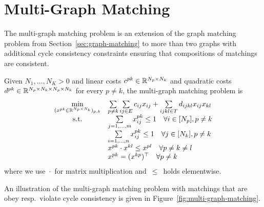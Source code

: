 \section{Multi-Graph Matching}
\label{sec:multi-graph-matching}
The multi-graph matching problem is an extension of the graph matching problem from Section~\ref{sec:graph-matching} to more than two graphs with additional cycle consistency constraints ensuring that compositions of matchings are consistent.

\begin{definition}
Given $N_1,\ldots,N_K > 0$ and linear costs $c^{pk} \in \mathbb{R}^{N_p \times N_k}$ and quadratic costs $d^{pk} \in \mathbb{R}^{N_p \times N_k \times N_p \times N_k}$ for every $p \neq k$, the multi-graph matching problem is
\begin{equation}
\begin{array}{cl}
    \min\limits_{(x^{pk} \in \mathbb{R}^{N_p \times N_k})_{p,k}}
    &\sum\limits_{p \neq k} \sum\limits_{ij \in E} c_{ij} x_{ij} + \sum\limits_{ijkl \in T} d_{ijkl} x_{ij} x_{kl} \\ 
\text{s.t.}
& \sum\limits_{j=1,\ldots,m} x^{pk}_{ij} \leq 1 \quad \forall i\in [N_p], p\neq k \\
& \sum\limits_{i=1,\ldots,n} x^{pk}_{ij} \leq 1 \quad \forall j\in [N_k], p\neq k \\
& x^{pk} \cdot x^{kl} \leq x^{pl} \quad \forall p \neq k \neq l \\
    & x^{pk} = (x^{kp})^\top \quad \forall p \neq k
\end{array}
\end{equation}
where we use~$\cdot$~for matrix multiplication and~$\leq$~holds elementwise.
\end{definition}

An illustration of the multi-graph matching problem with matchings that are obey resp.\ violate cycle consistency is given in Figure~\ref{fig:multi-graph-matching}.

